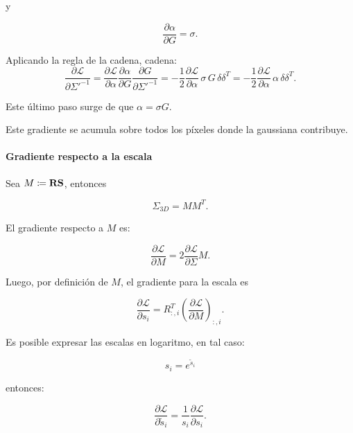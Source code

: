 \noindent y

\begin{equation}
    \frac{\partial \alpha}{\partial G} = \sigma.
\end{equation}

Aplicando la regla de la cadena, cadena:
\begin{equation}
\frac{\partial \mathcal{L}}{\partial \Sigma'^{-1}} = \frac{\partial \mathcal{L}}{\partial \alpha} \frac{\partial \alpha}{\partial G} \frac{\partial G}{\partial \Sigma'^{-1}} = 
-\frac{1}{2} \frac{\partial \mathcal{L}}{\partial \alpha} \, \sigma\, G\, \delta \delta^T
= -\frac{1}{2} \frac{\partial \mathcal{L}}{\partial \alpha} \, \alpha\, \delta \delta^T.
\end{equation}

Este último paso surge de que $\alpha = \sigma G$.

Este gradiente se acumula sobre todos los píxeles donde la gaussiana contribuye.



\paragraph{Gradiente respecto a la escala}

Sea $M \coloneq \mathbf{R} \mathbf{S}$, entonces

\begin{equation}
\Sigma_{3D} = M M^T.
\end{equation}

El gradiente respecto a $M$ es:

\begin{equation}
\frac{\partial \mathcal{L}}{\partial M}
= 2 \frac{\partial \mathcal{L}}{\partial \Sigma} M.
\end{equation}

Luego, por definición de $M$, el gradiente para la escala es

\begin{equation}
\frac{\partial \mathcal{L}}{\partial s_i}
=
R_{:,i}^T
\left(
\frac{\partial \mathcal{L}}{\partial M}
\right)_{:,i}.
\end{equation}

Es posible expresar las escalas en logaritmo, en tal caso:

\begin{equation}
s_i = e^{\tilde{s}_i}
\end{equation}

\noindent entonces:

\begin{equation}
\frac{\partial \mathcal{L}}{\partial \tilde{s}_i}
=
\frac{1}{s_i}
\frac{\partial \mathcal{L}}{\partial s_i}.
\end{equation}


